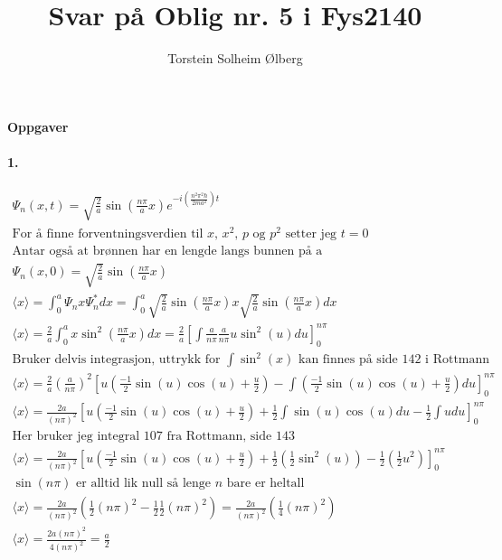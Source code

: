 \documentclass[11pt, A4paper,norsk]{article}
\author{Torstein Solheim Ølberg}
\title{Svar på Oblig nr. 5 i Fys2140}
\begin{document}
\maketitle
	\begin{center}
\Large \textbf{Oppgaver}
	\end{center}









		\paragraph{1.}
			\begin{gather*}
\Psi_n(x, t) = \sqrt{\frac{2}{a}} \sin\left( \frac{n \pi}{a} x \right) e^{-i\left( \frac{n^2 \pi^2 \hbar}{2 m a^2} \right)t} \\
\text{For å finne forventningsverdien til $x$, $x^2$, $p$ og $p^2$ setter jeg $t = 0$} \\
\text{Antar også at brønnen har en lengde langs bunnen på a} \\
\Psi_n(x, 0) = \sqrt{\frac{2}{a}} \sin\left( \frac{n \pi}{a} x \right) \\
\langle x \rangle = \int_{0}^{a} \Psi_n x \Psi_n^* dx = \int_{0}^{a} \sqrt{\frac{2}{a}} \sin\left( \frac{n \pi}{a} x \right) x \sqrt{\frac{2}{a}} \sin\left( \frac{n \pi}{a} x \right) dx \\
\langle x \rangle = \frac{2}{a} \int_{0}^{a} x \sin^2\left( \frac{n \pi}{a} x \right) dx = \frac{2}{a} \left[\int \frac{a}{n \pi} \frac{a}{n \pi}u \sin^2(u) du\right]_{0}^{n \pi} \\
\text{Bruker delvis integrasjon, uttrykk for $\int \sin^2(x)$ kan finnes på side $142$ i Rottmann} \\
\langle x \rangle = \frac{2}{a} \left(\frac{a}{n \pi}\right)^2 \left[ u \left( \frac{-1}{2} \sin(u)\cos(u) + \frac{u}{2} \right) - \int \left( \frac{-1}{2} \sin(u)\cos(u) + \frac{u}{2} \right) du \right]_{0}^{n \pi} \\
\langle x \rangle = \frac{2a}{(n \pi)^2} \left[ u \left( \frac{-1}{2} \sin(u)\cos(u) + \frac{u}{2} \right) + \frac{1}{2} \int \sin(u)\cos(u) du - \frac{1}{2} \int u du \right]_{0}^{n \pi} \\
\text{Her bruker jeg integral $107$ fra Rottmann, side $143$} \\
\langle x \rangle = \frac{2a}{(n \pi)^2} \left[ u \left( \frac{-1}{2} \sin(u)\cos(u) + \frac{u}{2} \right) + \frac{1}{2} \left( \frac{1}{2} \sin^2(u) \right) - \frac{1}{2} \left( \frac{1}{2} u^2 \right) \right]_{0}^{n \pi} \\
\text{$\sin(n \pi)$ er alltid lik null så lenge $n$ bare er heltall} \\
\langle x \rangle = \frac{2a}{(n \pi)^2} \left( \frac{1}{2} (n \pi)^2 - \frac{1}{2} \frac{1}{2} (n \pi)^2 \right) = \frac{2a}{(n \pi)^2} \left( \frac{1}{4} (n \pi)^2 \right)\\
\langle x \rangle = \frac{2a(n\pi)^2}{4(n\pi)^2} = \frac{a}{2}
			\end{gather*}
\end{document}
